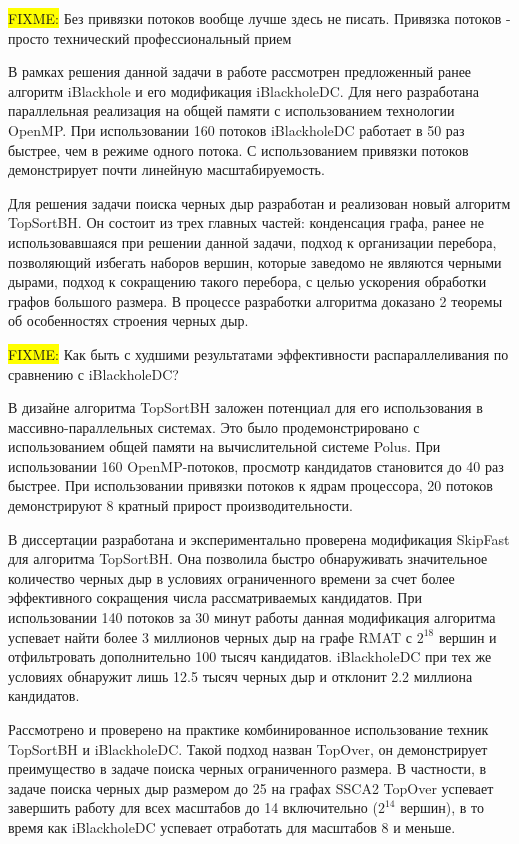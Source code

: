 \documentclass[12pt,a4paper,oneside,openany]{article}
\newcommand{\FIXME}[1]{ %
	\colorbox{yellow}{FIXME:} #1
}
\theoremstyle{definition}
\theoremstyle{lemma}
\theoremstyle{remark}
\begin{document}
\FIXME{Без привязки потоков вообще лучше здесь не писать. Привязка потоков - просто технический профессиональный прием}

В рамках решения данной задачи в работе рассмотрен предложенный ранее алгоритм iBlackhole и его модификация
iBlackholeDC. Для него разработана параллельная реализация на общей памяти с использованием технологии OpenMP. При использовании 160 потоков iBlackholeDC
работает в 50 раз быстрее, чем в режиме одного потока. С использованием привязки потоков демонстрирует
почти линейную масштабируемость.

Для решения задачи поиска черных дыр разработан и реализован новый алгоритм TopSortBH.
Он состоит из трех главных частей: конденсация графа, ранее не
использовавшаяся при решении данной задачи, подход к организации перебора,
позволяющий избегать наборов вершин, которые заведомо не являются черными дырами,
подход к сокращению такого перебора, с целью ускорения обработки графов большого размера.
В процессе разработки алгоритма доказано 2 теоремы об особенностях строения черных дыр.

\FIXME{Как быть с худшими результатами эффективности распараллеливания по сравнению с iBlackholeDC?}

В дизайне алгоритма TopSortBH заложен потенциал для его использования в
массивно-параллельных системах. Это было продемонстрировано с использованием общей памяти на вычислительной системе Polus.
При использовании 160 OpenMP-потоков, просмотр кандидатов становится до 40 раз быстрее.
При использовании привязки потоков к ядрам процессора, 20 потоков демонстрируют 8 кратный прирост производительности.

В диссертации разработана и экспериментально проверена модификация SkipFast для алгоритма TopSortBH. Она позволила быстро
обнаруживать значительное количество черных дыр в условиях ограниченного времени за счет более эффективного сокращения числа рассматриваемых кандидатов.
При использовании 140 потоков за 30 минут работы данная модификация алгоритма успевает найти более 3 миллионов черных дыр на графе RMAT с $2^{18}$ вершин и
отфильтровать дополнительно 100 тысяч кандидатов. iBlackholeDC при тех же условиях обнаружит лишь 12.5 тысяч черных дыр и отклонит 2.2 миллиона кандидатов.

Рассмотрено и проверено на практике комбинированное использование техник TopSortBH и iBlackholeDC. Такой подход назван TopOver, он демонстрирует преимущество в задаче поиска черных ограниченного размера.
В частности, в задаче поиска черных дыр размером до 25 на графах SSCA2 TopOver успевает
завершить работу для всех масштабов до 14 включительно ($2^{14}$ вершин), в то время как iBlackholeDC успевает отработать для масштабов 8 и меньше.
\end{document}
